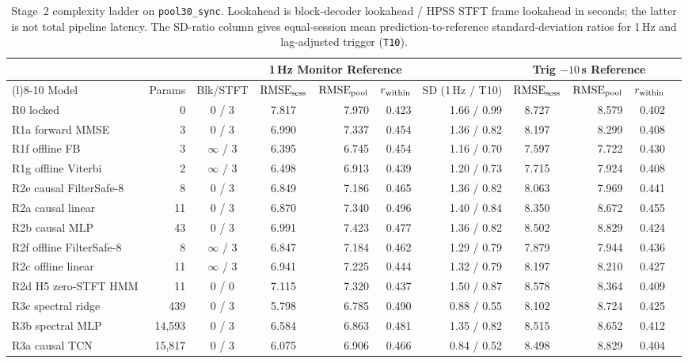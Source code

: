 \begin{table}[htbp]
  \centering
  \scriptsize
  \setlength{\tabcolsep}{3.5pt}
  \caption{Stage~2 complexity ladder on \texttt{pool30\_sync}. Lookahead is block-decoder
  lookahead / HPSS STFT frame lookahead in seconds; the latter is not total pipeline latency.
  The SD-ratio column gives equal-session mean prediction-to-reference standard-deviation
  ratios for 1\,Hz and lag-adjusted trigger (\texttt{T10}).}
  \label{tab:ch4_complexity_ladder}
  \begin{tabularx}{\textwidth}{@{}>{\raggedright\arraybackslash}Xrcc rrr c rrr@{}}
    \toprule
    & & & \multicolumn{3}{c}{\textbf{1\,Hz Monitor Reference}} & & \multicolumn{3}{c}{\textbf{Trig $-10$\,s Reference}} \\
    \cmidrule(lr){4-6} \cmidrule(l){8-10}
    Model & Params & Blk/STFT & $\mathrm{RMSE}_{\mathrm{sess}}$ & $\mathrm{RMSE}_{\mathrm{pool}}$ & $r_{\mathrm{within}}$ & SD (1\,Hz / T10) & $\mathrm{RMSE}_{\mathrm{sess}}$ & $\mathrm{RMSE}_{\mathrm{pool}}$ & $r_{\mathrm{within}}$ \\
    \midrule
    R0 locked & 0 & 0 / 3 & 7.817 & 7.970 & 0.423 & 1.66 / 0.99 & 8.727 & 8.579 & 0.402 \\
    R1a forward MMSE & 3 & 0 / 3 & 6.990 & 7.337 & 0.454 & 1.36 / 0.82 & 8.197 & 8.299 & 0.408 \\
    R1f offline FB & 3 & $\infty$ / 3 & 6.395 & 6.745 & 0.454 & 1.16 / 0.70 & 7.597 & 7.722 & 0.430 \\
    R1g offline Viterbi & 2 & $\infty$ / 3 & 6.498 & 6.913 & 0.439 & 1.20 / 0.73 & 7.715 & 7.924 & 0.408 \\
    R2e causal FilterSafe-8 & 8 & 0 / 3 & 6.849 & 7.186 & 0.465 & 1.36 / 0.82 & 8.063 & 7.969 & 0.441 \\
    R2a causal linear & 11 & 0 / 3 & 6.870 & 7.340 & 0.496 & 1.40 / 0.84 & 8.350 & 8.672 & 0.455 \\
    R2b causal MLP & 43 & 0 / 3 & 6.991 & 7.423 & 0.477 & 1.36 / 0.82 & 8.502 & 8.829 & 0.424 \\
    R2f offline FilterSafe-8 & 8 & $\infty$ / 3 & 6.847 & 7.184 & 0.462 & 1.29 / 0.79 & 7.879 & 7.944 & 0.436 \\
    R2c offline linear & 11 & $\infty$ / 3 & 6.941 & 7.225 & 0.444 & 1.32 / 0.79 & 8.197 & 8.210 & 0.427 \\
    R2d H5 zero-STFT HMM & 11 & 0 / 0 & 7.115 & 7.320 & 0.437 & 1.50 / 0.87 & 8.578 & 8.364 & 0.409 \\
    R3c spectral ridge & 439 & 0 / 3 & 5.798 & 6.785 & 0.490 & 0.88 / 0.55 & 8.102 & 8.724 & 0.425 \\
    R3b spectral MLP & 14,593 & 0 / 3 & 6.584 & 6.863 & 0.481 & 1.35 / 0.82 & 8.515 & 8.652 & 0.412 \\
    R3a causal TCN & 15,817 & 0 / 3 & 6.075 & 6.906 & 0.466 & 0.84 / 0.52 & 8.498 & 8.829 & 0.404 \\
    \bottomrule
  \end{tabularx}
\end{table}

